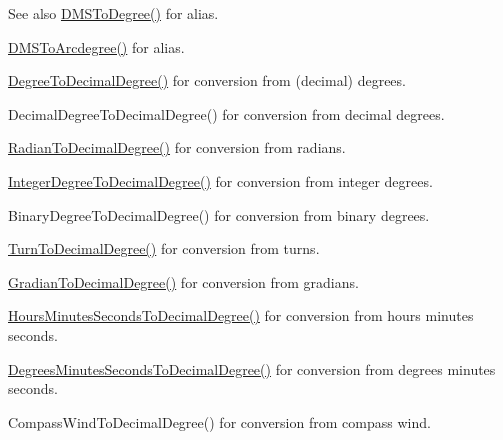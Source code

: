 \begin{DoxySeeAlso}{See also}
\mbox{\hyperlink{group___e_g_x_math-_angle_conversions-_d_m_s_ga3744d5ef737f693a191efc151d8ef3f3}{D\+M\+S\+To\+Degree()}} for alias. 

\mbox{\hyperlink{group___e_g_x_math-_angle_conversions-_d_m_s_ga641f46ead1a3f19312aab422e569b810}{D\+M\+S\+To\+Arcdegree()}} for alias. 

\mbox{\hyperlink{group___e_g_x_math-_angle_conversions-_degree_ga568afc1d436d425bf5d4edea584aee08}{Degree\+To\+Decimal\+Degree()}} for conversion from (decimal) degrees. 

Decimal\+Degree\+To\+Decimal\+Degree() for conversion from decimal degrees. 

\mbox{\hyperlink{group___e_g_x_math-_angle_conversions-_radian_ga6d170f1882c32de53167c04524d05f67}{Radian\+To\+Decimal\+Degree()}} for conversion from radians. 

\mbox{\hyperlink{group___e_g_x_math-_angle_conversions-_integer_degree_gac219c3198508ba984d8d81d22831b27d}{Integer\+Degree\+To\+Decimal\+Degree()}} for conversion from integer degrees. 

Binary\+Degree\+To\+Decimal\+Degree() for conversion from binary degrees. 

\mbox{\hyperlink{group___e_g_x_math-_angle_conversions-_turn_ga79231536255e77fb7a158b99a30c1767}{Turn\+To\+Decimal\+Degree()}} for conversion from turns. 

\mbox{\hyperlink{group___e_g_x_math-_angle_conversions-_gradian_ga346f47c519d5261b689cec49f4a8e789}{Gradian\+To\+Decimal\+Degree()}} for conversion from gradians. 

\mbox{\hyperlink{group___e_g_x_math-_angle_conversions-_hours_minutes_seconds_gad6662d1113ae8aea6baca6317888b4cd}{Hours\+Minutes\+Seconds\+To\+Decimal\+Degree()}} for conversion from hours minutes seconds. 

\mbox{\hyperlink{group___e_g_x_math-_angle_conversions-_degrees_minutes_seconds_gab4d4c25623f86611692c39eb29f16141}{Degrees\+Minutes\+Seconds\+To\+Decimal\+Degree()}} for conversion from degrees minutes seconds. 

Compass\+Wind\+To\+Decimal\+Degree() for conversion from compass wind. 
\end{DoxySeeAlso}
\mbox{\label{group___e_g_x_math-_angle_conversions-_d_m_s_ga3744d5ef737f693a191efc151d8ef3f3}} 

